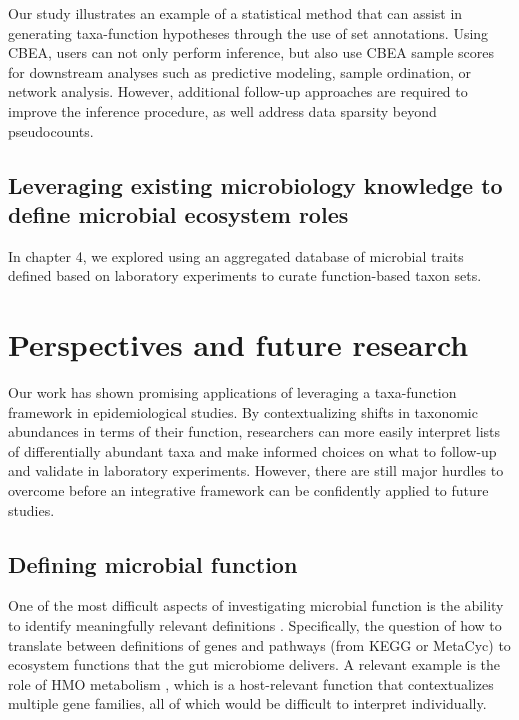 Our study illustrates an example of a statistical method that can assist in generating taxa-function hypotheses through the use of set annotations. Using CBEA, users can not only perform inference, but also use CBEA sample scores for downstream analyses such as predictive modeling, sample ordination, or network analysis. However, additional follow-up approaches are required to improve the inference procedure, as well address data sparsity beyond pseudocounts. 

\subsection{Leveraging existing microbiology knowledge to define microbial ecosystem roles}

In chapter 4, we explored using an aggregated database of microbial traits defined based on laboratory experiments to curate function-based taxon sets. 

\section{Perspectives and future research}

Our work has shown promising applications of leveraging a taxa-function framework in epidemiological studies. By contextualizing shifts in taxonomic abundances in terms of their function, researchers can more easily interpret lists of differentially abundant taxa and make informed choices on what to follow-up and validate in laboratory experiments. However, there are still major hurdles to overcome before an integrative framework can be confidently applied to future studies. 

\subsection{Defining microbial function}

One of the most difficult aspects of investigating microbial function is the ability to identify meaningfully relevant definitions \cite{heintz-buschart2018human, zhang2019advancing, klassen2018defining}. Specifically, the question of how to translate between definitions of genes and pathways (from KEGG or MetaCyc) to ecosystem functions that the gut microbiome delivers. A relevant example is the role of HMO metabolism \cite{vatanen2018human}, which is a host-relevant function that contextualizes multiple gene families, all of which would be difficult to interpret individually.  

